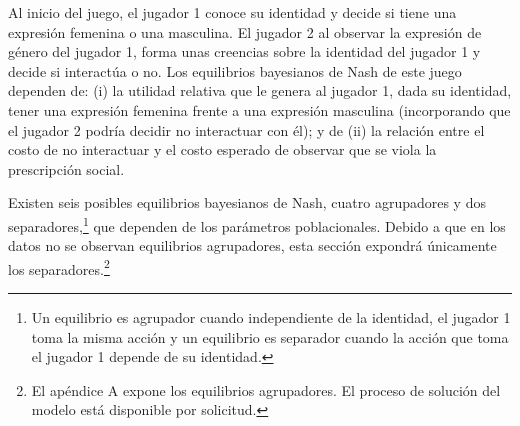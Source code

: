 \begin{figure}[ht!]
	\begin{singlespace}
\end{singlespace}
\end{figure}

Al inicio del juego, el jugador 1 conoce su identidad y decide si tiene una expresión femenina o una masculina. El jugador 2 al observar la expresión de género del jugador 1, forma unas creencias sobre la identidad del jugador 1 y decide si interactúa o no. Los equilibrios bayesianos de Nash de este juego dependen de: (i) la utilidad relativa que le genera al jugador 1, dada su identidad, tener una expresión femenina frente a una expresión masculina (incorporando que el jugador 2 podría decidir no interactuar con él); y de (ii) la relación entre el costo de no interactuar y el costo esperado de observar que se viola la prescripción social. 

Existen seis posibles equilibrios bayesianos de Nash, cuatro agrupadores y dos separadores,\footnote{Un equilibrio es agrupador cuando independiente de la identidad, el jugador 1 toma la misma acción y un equilibrio es separador cuando la acción que toma el jugador 1 depende de su identidad.} que dependen de los parámetros poblacionales. Debido a que en los datos no se observan equilibrios agrupadores, esta sección expondrá únicamente los separadores.\footnote{El apéndice A expone los equilibrios agrupadores. El proceso de solución del modelo está disponible por solicitud.}

